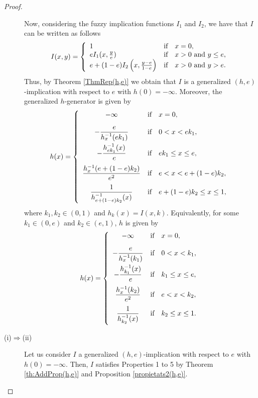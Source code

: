 \begin{proof}
\begin{description}
	Now, considering the fuzzy implication functions $I_1$ and $I_2$, we have that $I$ can be written as follows
	$$I(x,y)= \left\{ \begin{array}{lcl}
		1 &   \hbox{if}  & x=0, \\
		eI_1(x,\frac{y}{e}) &  \hbox{if} & x>0 \hbox{ and } y \leq e, \\
		e+(1-e)I_2\left(x,\frac{y-e}{1-e}\right) &  \hbox{if} & x>0 \hbox{ and } y>e. \\
	\end{array}
	\right.
	$$
	Thus, by Theorem \ref{ThmRep(h,e)} we obtain that $I$ is a generalized $(h,e)$-implication with respect to $e$ with $h(0)=-\infty$. Moreover, the generalized $h$-generator is given by
	$$h(x)=\left\{ \begin{array}{ccl}
		- \infty &  \hbox{if} & x=0, \\[1em]
		\displaystyle -\frac{e}{h_{x}^{-1}(ek_1)} &  \hbox{if} & 0<x<ek_1, \\[1em]
		\displaystyle -\frac{h_{ek_1}^{-1}(x)}{e} &   \hbox{if}  & ek_1 \leq x \leq e, \\[1em]        
		\displaystyle \frac{h_x^{-1}(e+(1-e)k_2)}{e^2} &   \hbox{if}  & e<x<e+(1-e)k_2, \\[1em]
		\displaystyle \frac{1}{h_{e+(1-e)k_2}^{-1}(x)} &   \hbox{if}  & e+(1-e)k_2\leq x\leq 1, \\
	\end{array}
	\right.
	$$
	where $k_1,k_2 \in (0,1)$ and $h_k(x)=I(x,k)$. Equivalently, for some $k_1 \in (0,e)$ and $k_2 \in (e,1)$, $h$ is given by
	$$h(x)=\left\{ \begin{array}{ccl}
		- \infty &  \hbox{if} & x=0, \\  [1em]           
		\displaystyle -\frac{e}{h_{x}^{-1}(k_1)} &  \hbox{if} & 0<x<k_1, \\[1em]
		\displaystyle -\frac{h_{k_1}^{-1}(x)}{e} &   \hbox{if}  & k_1 \leq x \leq e, \\[1em]
		\displaystyle \frac{h_x^{-1}(k_2)}{e^2} &   \hbox{if}  & e<x<k_2, \\[1em]
		\displaystyle \frac{1}{h_{k_2}^{-1}(x)} &   \hbox{if}  & k_2\leq x\leq 1. \\[1em]
	\end{array}
	\right.
	$$
	\item[(i)$\Rightarrow$(ii)] Let us consider $I$ a generalized $(h,e)$-implication with respect to $e$ with $h(0)= -\infty$. Then, $I$ satisfies Properties 1 to 5 by Theorem \ref{th:AddProp(h,e)} and Proposition \ref{propietats2(h,e)}.
	\end{description}
\end{proof}

